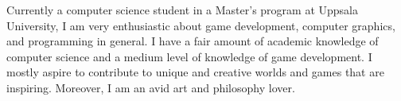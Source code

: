 

\begin{cvparagraph}

Currently a computer science student in a Master's program at Uppsala University, I am very enthusiastic about game development, computer graphics, and programming in general. I have a fair amount of academic knowledge of computer science and a medium level of knowledge of game development. I mostly aspire to contribute to unique and creative worlds and games that are inspiring. Moreover, I am an avid art and philosophy lover.
\end{cvparagraph}
